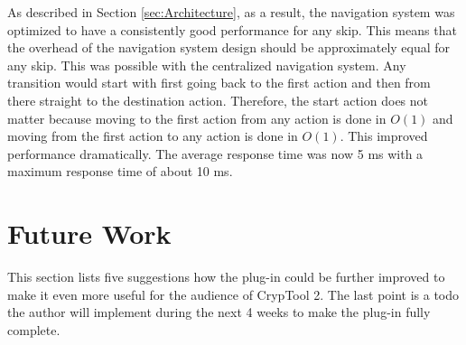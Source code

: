 \begin{enumerate}[label=(\labelenum{S}{{\arabic*}}), wide, labelwidth=!, labelindent=0pt]
As described in Section \autoref{sec:Architecture}, as a result, the navigation system was optimized to have a consistently good performance for any skip. This means that the overhead of the navigation system design should be approximately equal for any skip. This was possible with the centralized navigation system. Any transition would start with first going back to the first action and then from there straight to the destination action. Therefore, the start action does not matter because moving to the first action from any action is done in $O(1)$ and moving from the first action to any action is done in $O(1)$. This improved performance dramatically. The average response time was now 5 ms with a maximum response time of about 10 ms.


\end{enumerate}

\section{Future Work}
\label{sec:futureWork}

This section lists five suggestions how the plug-in could be further improved to make it even more useful for the audience of CrypTool 2. The last point is a todo the author will implement during the next 4 weeks to make the plug-in fully complete.

